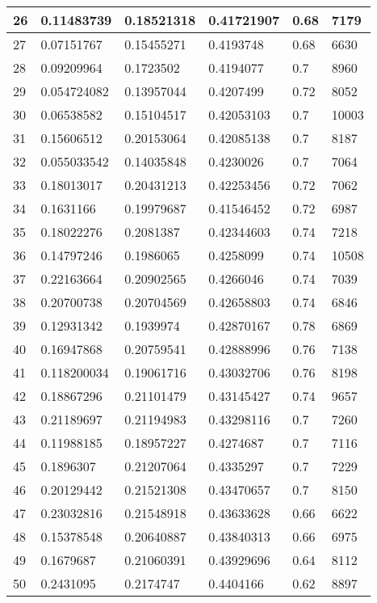 \begin{longtable}{|l|l|l|l|l|l|}
26 & 0.11483739 & 0.18521318 & 0.41721907 & 0.68 & 7179 \\ \hline 
27 & 0.07151767 & 0.15455271 & 0.4193748 & 0.68 & 6630 \\ \hline 
28 & 0.09209964 & 0.1723502 & 0.4194077 & 0.7 & 8960 \\ \hline 
29 & 0.054724082 & 0.13957044 & 0.4207499 & 0.72 & 8052 \\ \hline 
30 & 0.06538582 & 0.15104517 & 0.42053103 & 0.7 & 10003 \\ \hline 
31 & 0.15606512 & 0.20153064 & 0.42085138 & 0.7 & 8187 \\ \hline 
32 & 0.055033542 & 0.14035848 & 0.4230026 & 0.7 & 7064 \\ \hline 
33 & 0.18013017 & 0.20431213 & 0.42253456 & 0.72 & 7062 \\ \hline 
34 & 0.1631166 & 0.19979687 & 0.41546452 & 0.72 & 6987 \\ \hline 
35 & 0.18022276 & 0.2081387 & 0.42344603 & 0.74 & 7218 \\ \hline 
36 & 0.14797246 & 0.1986065 & 0.4258099 & 0.74 & 10508 \\ \hline 
37 & 0.22163664 & 0.20902565 & 0.4266046 & 0.74 & 7039 \\ \hline 
38 & 0.20700738 & 0.20704569 & 0.42658803 & 0.74 & 6846 \\ \hline 
39 & 0.12931342 & 0.1939974 & 0.42870167 & 0.78 & 6869 \\ \hline 
40 & 0.16947868 & 0.20759541 & 0.42888996 & 0.76 & 7138 \\ \hline 
41 & 0.118200034 & 0.19061716 & 0.43032706 & 0.76 & 8198 \\ \hline 
42 & 0.18867296 & 0.21101479 & 0.43145427 & 0.74 & 9657 \\ \hline 
43 & 0.21189697 & 0.21194983 & 0.43298116 & 0.7 & 7260 \\ \hline 
44 & 0.11988185 & 0.18957227 & 0.4274687 & 0.7 & 7116 \\ \hline 
45 & 0.1896307 & 0.21207064 & 0.4335297 & 0.7 & 7229 \\ \hline 
46 & 0.20129442 & 0.21521308 & 0.43470657 & 0.7 & 8150 \\ \hline 
47 & 0.23032816 & 0.21548918 & 0.43633628 & 0.66 & 6622 \\ \hline 
48 & 0.15378548 & 0.20640887 & 0.43840313 & 0.66 & 6975 \\ \hline 
49 & 0.1679687 & 0.21060391 & 0.43929696 & 0.64 & 8112 \\ \hline 
50 & 0.2431095 & 0.2174747 & 0.4404166 & 0.62 & 8897 \\ \hline 
\end{longtable}